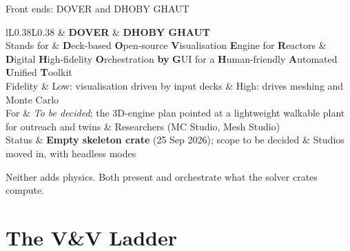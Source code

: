 \documentclass[aspectratio=169]{beamer}
\newcommand{\roadtab}[1]{{\footnotesize\setlength{\tabcolsep}{4pt}#1}}
\begin{document}
\begin{frame}{Front ends: DOVER and DHOBY GHAUT}
    \roadtab{
    \begin{tabular}{lL{0.38\textwidth}L{0.38\textwidth}}
        \toprule
        & \textbf{DOVER} & \textbf{DHOBY GHAUT} \\
        \midrule
        Stands for & \textbf{D}eck-based \textbf{O}pen-source
                     \textbf{V}isualisation \textbf{E}ngine for
                     \textbf{R}eactors
                   & \textbf{D}igital \textbf{H}igh-fidelity
                     \textbf{O}rchestration \textbf{by} \textbf{G}UI for a
                     \textbf{H}uman-friendly \textbf{A}utomated
                     \textbf{U}nified \textbf{T}oolkit \\
        Fidelity   & Low: visualisation driven by input decks
                   & High: drives meshing and Monte Carlo \\
        For        & \emph{To be decided}; the 3D-engine plan pointed at a
                     lightweight walkable plant for outreach and twins
                   & Researchers (MC Studio, Mesh Studio) \\
        Status     & \textbf{Empty skeleton crate} (25 Sep 2026);
                     scope to be decided
                   & Studios moved in, with headless modes \\
        \bottomrule
    \end{tabular}}

    \medskip
    \footnotesize
    Neither adds physics. Both present and orchestrate what the solver crates
    compute.
\end{frame}


\section{The V\&V Ladder}
\end{document}
